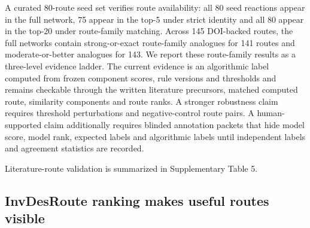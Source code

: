 \documentclass[11pt, letterpaper]{article}
\newcommand{\invdesroute}{InvDesRoute}
\begin{document}
A curated 80-route seed set verifies route availability: all 80 seed reactions appear in the full network, 75 appear in the top-5 under strict identity and all 80 appear in the top-20 under route-family matching. Across 145 DOI-backed routes, the full networks contain strong-or-exact route-family analogues for 141 routes and moderate-or-better analogues for 143. We report these route-family results as a three-level evidence ladder. The current evidence is an algorithmic label computed from frozen component scores, rule versions and thresholds and remains checkable through the written literature precursors, matched computed route, similarity components and route ranks. A stronger robustness claim requires threshold perturbations and negative-control route pairs. A human-supported claim additionally requires blinded annotation packets that hide model score, model rank, expected labels and algorithmic labels until independent labels and agreement statistics are recorded.



\noindent Literature-route validation is summarized in Supplementary Table 5.

\subsection*{\invdesroute{} ranking makes useful routes visible}
\end{document}
